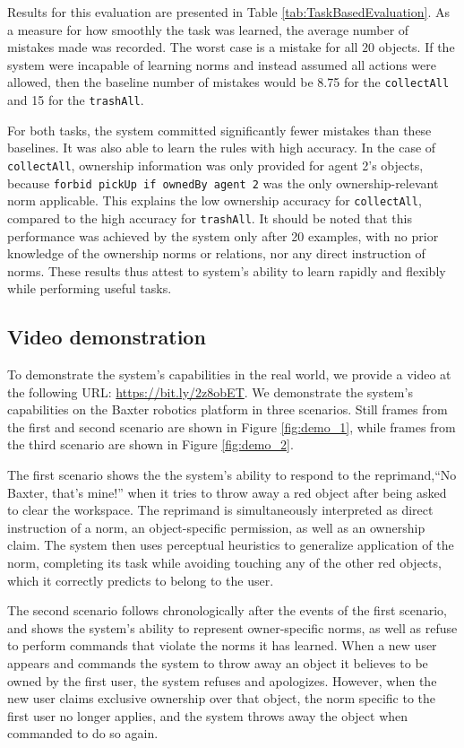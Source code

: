 \documentclass[letterpaper]{article} %
\begin{document}
Results for this evaluation are presented in Table \ref{tab:TaskBasedEvaluation}. As a measure for how smoothly the task was learned, the average number of mistakes made was recorded. The worst case is a mistake for all $20$ objects. If the system were incapable of learning norms and instead assumed all actions were allowed, then the baseline number of mistakes would be 8.75 for the \texttt{\small collectAll} and 15 for the \texttt{\small trashAll}.

For both tasks, the system committed significantly fewer mistakes than these baselines. It was also able to learn the rules with high accuracy. In the case of \texttt{\small collectAll}, ownership information was only provided for agent 2's objects, because \texttt{\small forbid pickUp if ownedBy agent 2} was the only ownership-relevant norm applicable. This explains the low ownership accuracy for \texttt{\small collectAll}, compared to the high accuracy for \texttt{\small trashAll}. It should be noted that this performance was achieved by the system only after 20 examples, with no prior knowledge of the ownership norms or relations, nor any direct instruction of norms. These results thus attest to system's ability to learn rapidly and flexibly while performing useful tasks.

\subsection{Video demonstration}

To demonstrate the system's capabilities in the real world, we provide a video at the following URL: \url{https://bit.ly/2z8obET}. We demonstrate the system's capabilities on the Baxter robotics platform in three scenarios. Still frames from the first and second scenario are shown in Figure \ref{fig:demo_1}, while frames from the third scenario are shown in Figure \ref{fig:demo_2}.

The first scenario shows the the system's ability to respond to the reprimand,``No Baxter, that's mine!'' when it tries to throw away a red object after being asked to clear the workspace. The reprimand is simultaneously interpreted as direct instruction of a norm, an object-specific permission, as well as an ownership claim. The system then uses perceptual heuristics to generalize application of the norm, completing its task while avoiding touching any of the other red objects, which it correctly predicts to belong to the user.

The second scenario follows chronologically after the events of the first scenario, and shows the system's ability to represent owner-specific norms, as well as refuse to perform commands that violate the norms it has learned. When a new user appears and commands the system to throw away an object it believes to be owned by the first user, the system refuses and apologizes. However, when the new user claims exclusive ownership over that object, the norm specific to the first user no longer applies, and the system throws away the object when commanded to do so again.
\end{document}
